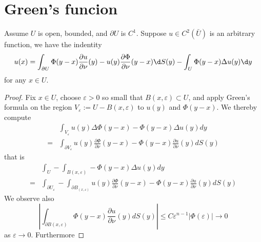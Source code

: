 \section{Green's funcion}%
\begin{lemma}
    Assume $U$ is open, bounded, and $\partial U$ is $C^1$. Suppose $u \in C^2(\bar{U})$ is an arbitrary function, we have the indentity
    \begin{equation*}
        u(x)
        =
        \int_{\partial U} \Phi(y-x) \frac{\partial u}{\partial \nu}(y)-u(y) \frac{\partial \Phi}{\partial \nu}(y-x) \d S(y)
        -
        \int_U \Phi(y-x) \Delta u(y) \d y
    \end{equation*}
    for any $x\in U$.
    \begin{proof}
        Fix $x \in U$, choose $\varepsilon>0$ so small that $B(x, \varepsilon) \subset U$, and apply Green's formula on the region $V_{\varepsilon}:=U-B(x, \varepsilon)$ to $u(y)$ and $\Phi(y-x)$. We thereby compute
        \begin{equation*}
            \begin{aligned}
                  & \int_{V_{\varepsilon}} u(y) \Delta \Phi(y-x)-\Phi(y-x) \Delta u(y) d y                                                           \\
                = & \int_{\partial V_{\varepsilon}} u(y) \frac{\partial \Phi}{\partial \nu}(y-x)-\Phi(y-x) \frac{\partial u}{\partial \nu}(y) d S(y)
            \end{aligned}
        \end{equation*}
        that is
        \begin{equation*}
            \begin{aligned}
                  & \int_{U}-\int_{B(x,\varepsilon)} -\Phi(y-x) \Delta u(y) d y         \\
                = & \int_{\partial U_{\varepsilon}}-\int_{\partial B_{(x,\varepsilon)}}
                u(y) \frac{\partial \Phi}{\partial \nu}(y-x)-\Phi(y-x) \frac{\partial u}{\partial \nu}(y) d S(y)
            \end{aligned}
        \end{equation*}
        We observe also
        \begin{equation*}
            \left|\int_{\partial B(x, \varepsilon)} \Phi(y-x) \frac{\partial u}{\partial \nu}(y) d S(y)\right| \leq C \varepsilon^{n-1} \left|\Phi(\varepsilon)\right| \to 0
        \end{equation*}
        as $\varepsilon \rightarrow 0$. Furthermore

\end{proof}
\end{lemma}
